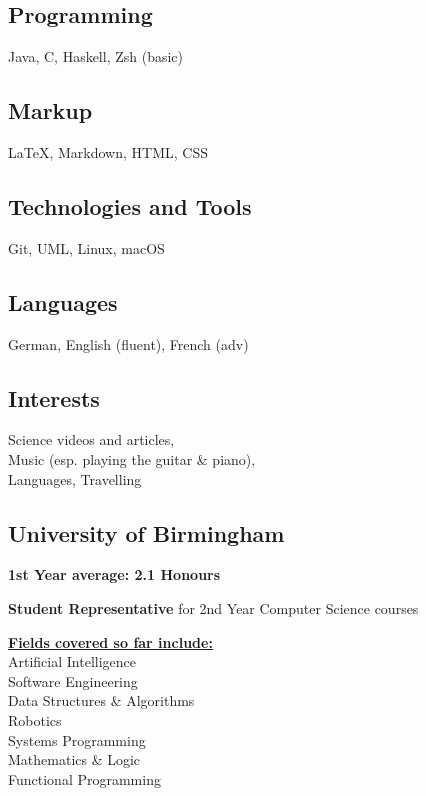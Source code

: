 \documentclass[]{jonas-cv}
\begin{document}
\begin{minipage}[t]{0.33\textwidth} 


\tinysectionsep
\subsection{Programming}
Java, C, Haskell, Zsh (basic)
\sectionsep

\subsection{Markup}
\LaTeX, Markdown, HTML, CSS
\sectionsep

\subsection{Technologies and Tools}
Git, UML, Linux, macOS
\sectionsep

\subsection{Languages}
German, English (fluent), French (adv)
\sectionsep

\subsection{Interests}
Science videos and articles,\\
Music (esp. playing the guitar \& piano),\\
Languages, Travelling
\largesectionsep

\tinysectionsep
\vspace{0.25mm}
\subsection{University of Birmingham}
\sectionsep

\begin{tightemize}
    \item \textbf{1st Year average: 2.1 Honours}
    \item \textbf{Student Representative} for 2nd Year Computer Science courses
    \item \textbf{\underline{Fields covered so far include:}}\\
    Artificial Intelligence \\
    Software Engineering \\
    Data Structures \& Algorithms \\
    Robotics \\
    Systems Programming \\
    Mathematics \& Logic \\
    Functional Programming
\end{tightemize}
\largesectionsep



\end{minipage}
\end{document}
